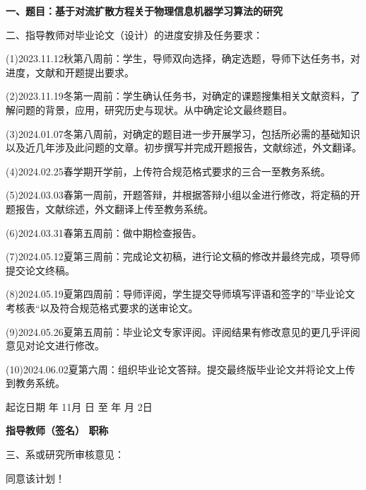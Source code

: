 \cleardoublepage{}

{
    \bfseries
    \noindent 一、题目：基于对流扩散方程关于物理信息机器学习算法的研究

    \noindent 二、指导教师对毕业论文（设计）的进度安排及任务要求：

    (1)2023.11.12秋第八周前：学生，导师双向选择，确定选题，导师下达任务书，对进度，文献和开题提出要求。

    (2)2023.11.19冬第一周前：学生确认任务书，对确定的课题搜集相关文献资料，了解问题的背景，应用，研究历史与现状。从中确定论文最终题目。

    (3)2024.01.07冬第八周前，对确定的题目进一步开展学习，包括所必需的基础知识以及近几年涉及此问题的文章。初步撰写并完成开题报告，文献综述，外文翻译。

    (4)2024.02.25春学期开学前，上传符合规范格式要求的三合一至教务系统。

    (5)2024.03.03春第一周前，开题答辩，并根据答辩小组以金进行修改，将定稿的开题报告，文献综述，外文翻译上传至教务系统。

    (6)2024.03.31春第五周前：做中期检查报告。

    (7)2024.05.12夏第三周前：完成论文初稿，进行论文稿的修改并最终完成，项导师提交论文终稿。
    
    (8)2024.05.19夏第四周前：导师评阅，学生提交导师填写评语和签字的”毕业论文考核表“以及符合规范格式要求的送审论文。

    (9)2024.05.26夏第五周前：毕业论文专家评阅。评阅结果有修改意见的更几乎评阅意见对论文进行修改。

    (10)2024.06.02夏第六周：组织毕业论文答辩。提交最终版毕业论文并将论文上传到教务系统。

    \noindent 起讫日期  年 \quad  11月   日 \quad 至 \quad  {} 年  月  \quad 2日
    \begin{flushright}
        \bfseries {}
            指导教师（签名） \underline{} 职称 \underline{}
    \end{flushright}

    \noindent 三、系或研究所审核意见：

    同意该计划！
    \signature{负责人（签名）}
}
